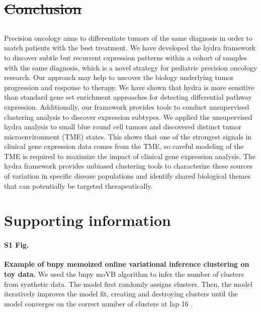 \documentclass[10pt,letterpaper]{article}
\providecommand{\DIFaddtex}[1]{{\protect\color{blue}\uwave{#1}}} %
\providecommand{\DIFdeltex}[1]{{\protect\color{red}\sout{#1}}}                      %
\providecommand{\DIFaddbegin}{} %
\providecommand{\DIFaddend}{} %
\providecommand{\DIFdelbegin}{} %
\providecommand{\DIFdelend}{} %
\providecommand{\DIFadd}[1]{\texorpdfstring{\DIFaddtex{#1}}{#1}} %
\providecommand{\DIFdel}[1]{\texorpdfstring{\DIFdeltex{#1}}{}} %
\newcommand{\DIFscaledelfig}{0.5}
\newlength{\DIFdelgraphicswidth} %
\newlength{\DIFdelgraphicsheight} %
\newcommand{\DIFaddincludegraphics}[2][]{{\color{blue}\fbox{\DIFOincludegraphics[#1]{#2}}}} %
\newcommand{\DIFdelincludegraphics}[2][]{%
\sbox{\DIFdelgraphicsbox}{\DIFOincludegraphics[#1]{#2}}%
\settoboxwidth{\DIFdelgraphicswidth}{\DIFdelgraphicsbox} %
\settoboxtotalheight{\DIFdelgraphicsheight}{\DIFdelgraphicsbox} %
\scalebox{\DIFscaledelfig}{%
\parbox[b]{\DIFdelgraphicswidth}{\usebox{\DIFdelgraphicsbox}\\[-\baselineskip] \rule{\DIFdelgraphicswidth}{0em}}\llap{\resizebox{\DIFdelgraphicswidth}{\DIFdelgraphicsheight}{%
\setlength{\unitlength}{\DIFdelgraphicswidth}%
\begin{picture}(1,1)%
\thicklines\linethickness{2pt} %
{\color[rgb]{1,0,0}\put(0,0){\framebox(1,1){}}}%
{\color[rgb]{1,0,0}\put(0,0){\line( 1,1){1}}}%
{\color[rgb]{1,0,0}\put(0,1){\line(1,-1){1}}}%
\end{picture}%
}\hspace*{3pt}}} %
} %
\DeclareRobustCommand{\DIFaddbegin}{\DIFOaddbegin \let\includegraphics\DIFaddincludegraphics} %
\DeclareRobustCommand{\DIFaddend}{\DIFOaddend \let\includegraphics\DIFOincludegraphics} %
\DeclareRobustCommand{\DIFdelbegin}{\DIFOdelbegin \let\includegraphics\DIFdelincludegraphics} %
\DeclareRobustCommand{\DIFdelend}{\DIFOaddend \let\includegraphics\DIFOincludegraphics} %
\begin{document}
\DIFdelbegin \section*{\DIFdel{Conclusion}}
\DIFdelend \DIFaddbegin \subsection*{\DIFadd{Conclusion}}
\DIFaddend Precision oncology aims to differentiate tumors of the same diagnosis in order to match patients with the best treatment. We have developed the hydra framework to discover subtle but recurrent expression patterns within a cohort of samples with the same diagnosis, which is a novel strategy for pediatric precision oncology research. Our approach may help to uncover the biology underlying tumor progression and response to therapy. We have shown that hydra is more sensitive than standard gene set enrichment approaches for detecting differential pathway expression. Additionally, our framework provides tools to conduct unsupervised clustering analysis to discover expression subtypes. We applied the unsupervised hydra analysis to small blue round cell tumors and discovered distinct tumor microenvironment (TME) states. This shows that one of the strongest signals in clinical gene expression data comes from the TME, so careful modeling of the TME is required to maximize the impact of clinical gene expression analysis. The hydra framework provides unbiased clustering tools to characterize these sources of variation in specific disease populations and identify shared biological themes that can potentially be targeted therapeutically.

\section*{Supporting information}

\paragraph*{S1 Fig.}
\label{S1_Fig}
{\bf Example of bnpy memoized online variational inference clustering on toy data.} We used the bnpy moVB algorithm to infer the number of clusters from synthetic data. The model first randomly assigns clusters. Then, the model iteratively improves the model fit, creating and destroying clusters until the model converges on the correct number of clusters at lap 16 \cite{hughesBnpyReliableScalable}.
\end{document}
